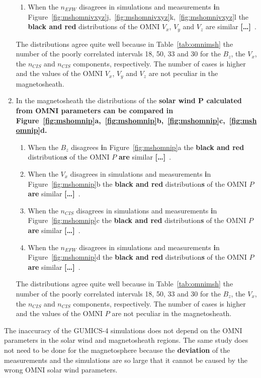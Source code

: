 \documentclass[linenumbers,draft]{agujournal}
\newcommand{\del}{\textbf{[\dots]}\ } %
\begin{document}
\begin{enumerate}
\begin{enumerate}
\item When the $n_{EFW}$ disagrees in simulations and measurements \textbf{i}n Figure~\ref{fig:mshomnivxyz}j,~\ref{fig:mshomnivxyz}k,~\ref{fig:mshomnivxyz}l the \textbf{black and red} distributions of the OMNI $V_{x}$, $V_{y}$ and $V_{z}$ are similar \del.
\end{enumerate}
The distributions agree quite well because in Table~\ref{tab:omnimsh} the number of the poorly correlated intervals 18, 50, 33 and 30 for the $B_{z}$, the $V_{x}$, the $n_{CIS}$ and $n_{CIS}$ components, respectively. The number of cases is higher and the values of the OMNI $V_{x}$, $V_{y}$ and $V_{z}$ are not peculiar in the magnetosheath.

\item In the magnetosheath the distributions of the \textbf{solar wind P calculated from OMNI parameters can be compared \textbf{i}n Figure~\ref{fig:mshomnip}a,~\ref{fig:mshomnip}b,~\ref{fig:mshomnip}c,~\ref{fig:mshomnip}d.}
\begin{enumerate}
\item When the $B_{z}$ disagrees \textbf{i}n Figure~\ref{fig:mshomnip}a the \textbf{black and red} distribution\textbf{s} of the OMNI $P$ \textbf{are} similar \del .

\item When the $V_{x}$ disagrees in simulations and measurements \textbf{i}n Figure~\ref{fig:mshomnip}b the \textbf{black and red} distribution\textbf{s} of the OMNI $P$ \textbf{are} similar \del .

\item When the $n_{CIS}$ disagrees in simulations and measurements \textbf{i}n Figure~\ref{fig:mshomnip}c the \textbf{black and red} distribution\textbf{s} of the OMNI $P$ \textbf{are} similar \del .

\item When the $n_{EFW}$ disagrees in simulations and measurements \textbf{i}n Figure~\ref{fig:mshomnip}d the \textbf{black and red} distribution\textbf{s} of the OMNI $P$ \textbf{are} similar \del .
\end{enumerate}
The distributions agree quite well because in Table~\ref{tab:omnimsh} the number of the poorly correlated intervals 18, 50, 33 and 30 for the $B_{z}$, the $V_{x}$, the $n_{CIS}$ and $n_{CIS}$ components, respectively. The number of cases is higher and the values of the OMNI $P$ are not peculiar in the magnetosheath.
\end{enumerate}
The inaccuracy of the GUMICS-4 simulations does not depend on the OMNI parameters in the solar wind and magnetosheath regions. The same study does not need to be done for the magnetosphere because the \textbf{deviation} of the measurements and the simulations are so large that it cannot be caused by the wrong OMNI solar wind parameters.
\end{document}
